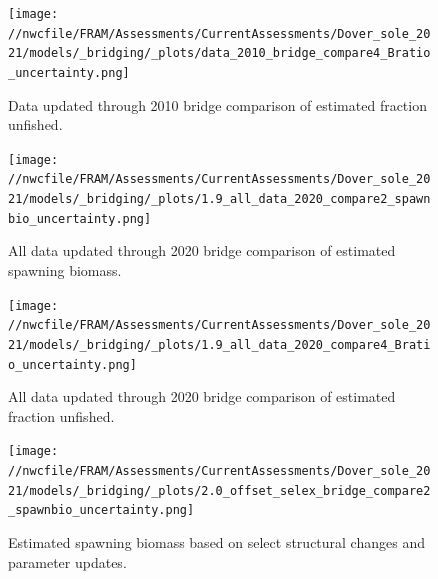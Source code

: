 \documentclass[11pt,
  english,
  a4paper,
]{article}
\begin{document}
\tagmcend\tagstructend


\begin{figure}
\centering
\texttt{[image: //nwcfile/FRAM/Assessments/CurrentAssessments/Dover\_sole\_2021/models/\_bridging/\_plots/data\_2010\_bridge\_compare4\_Bratio\_uncertainty.png]}
\caption{Data updated through 2010 bridge comparison of estimated fraction unfished.\label{fig:data-bridge-depl}}
\end{figure}

\tagmcend\tagstructend


\begin{figure}
\centering
\texttt{[image: //nwcfile/FRAM/Assessments/CurrentAssessments/Dover\_sole\_2021/models/\_bridging/\_plots/1.9\_all\_data\_2020\_compare2\_spawnbio\_uncertainty.png]}
\caption{All data updated through 2020 bridge comparison of estimated spawning biomass.\label{fig:all-data-bridge-ssb}}
\end{figure}

\tagmcend\tagstructend


\begin{figure}
\centering
\texttt{[image: //nwcfile/FRAM/Assessments/CurrentAssessments/Dover\_sole\_2021/models/\_bridging/\_plots/1.9\_all\_data\_2020\_compare4\_Bratio\_uncertainty.png]}
\caption{All data updated through 2020 bridge comparison of estimated fraction unfished.\label{fig:all-data-bridge-depl}}
\end{figure}

\tagmcend\tagstructend


\begin{figure}
\centering
\texttt{[image: //nwcfile/FRAM/Assessments/CurrentAssessments/Dover\_sole\_2021/models/\_bridging/\_plots/2.0\_offset\_selex\_bridge\_compare2\_spawnbio\_uncertainty.png]}
\caption{Estimated spawning biomass based on select structural changes and parameter updates.\label{fig:structure-bridge-ssb}}
\end{figure}
\end{document}
